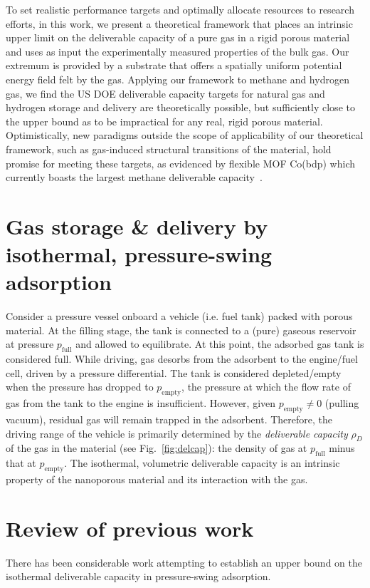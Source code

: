 \documentclass[pre,twocolumn]{revtex4-2}
\newcommand\pfull{\ensuremath{p_{\text{full}}}}
\newcommand\pempty{\ensuremath{p_{\text{empty}}}}
\begin{document}
To set realistic performance targets and optimally allocate resources to research efforts,
in this work, we present a theoretical framework that places an intrinsic upper
limit on the deliverable capacity of a pure gas in a rigid porous material and
uses as input the experimentally measured properties of the bulk gas. Our
extremum is provided by a substrate that offers a spatially uniform potential
energy field felt by the gas. Applying our framework to methane and hydrogen
gas, we find the US DOE deliverable capacity targets for natural gas and
hydrogen storage and delivery are theoretically possible, but sufficiently
close to the upper bound as to be impractical for any real, rigid porous
material. Optimistically, new paradigms outside the scope of applicability of
our theoretical framework, such as gas-induced structural transitions of the
material, hold promise for meeting these targets, as evidenced by flexible MOF
Co(bdp) which currently boasts the largest methane deliverable
capacity~\cite{mason2015methane}.

\section{Gas storage \& delivery by isothermal, pressure-swing adsorption}
Consider a pressure vessel onboard a vehicle (i.e. fuel tank) packed with
porous material. At the filling stage, the tank is connected to a (pure)
gaseous reservoir at pressure $\pfull$ and allowed to equilibrate. At this
point, the adsorbed gas tank is considered full. While driving, gas desorbs
from the adsorbent to the engine/fuel cell, driven by a pressure differential.
The tank is considered depleted/empty when the pressure has dropped to
$\pempty$, the pressure at which the flow rate of gas from the tank to the
engine is insufficient. However, given $\pempty \neq 0$ (pulling vacuum),
residual gas will remain trapped in the adsorbent. Therefore, the driving range
of the vehicle is primarily determined by the \emph{deliverable capacity} $\rho_D$ of
the gas in the material (see Fig.~\ref{fig:delcap}): the density of gas at
$\pfull$ minus that at $\pempty$. The isothermal, volumetric deliverable
capacity is an intrinsic property of the nanoporous material and its
interaction with the gas.

\section{Review of previous work}
There has been considerable work attempting to establish an upper bound on the
isothermal deliverable capacity in pressure-swing adsorption.
\end{document}
